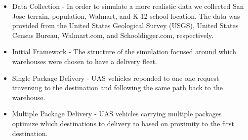 
\begin{itemize}
\item{Data Collection - In order to simulate a more realistic data we collected San Jose terrain, population, Walmart, and K-12 school location. The data was provided from the United States Geological Survey (USGS), United States Census Bureau, Walmart.com, and Schooldigger.com, respectively. }
\item{Initial Framework - The structure of the simulation focused around which warehouses were chosen to have a delivery fleet.}
\item{Single Package Delivery - UAS vehicles reponded to one one request traversing to the destination and following the same path back to the warehouse.}
\item{Multiple Package Delivery - UAS vehicles carrying multiple packages optimize which destinations to delivery to based on proximity to the first destination.}
\end{itemize}
